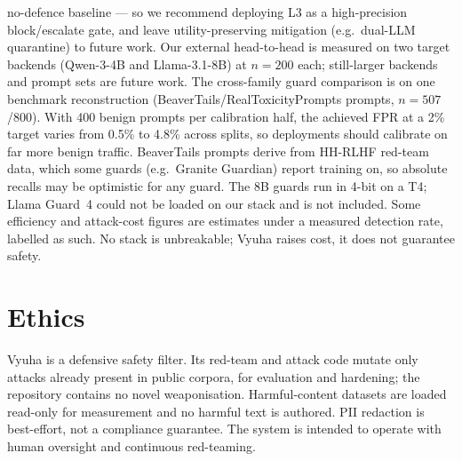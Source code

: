 \documentclass[11pt]{article}
\begin{document}
no-defence baseline --- so we recommend deploying L3 as a high-precision block/escalate gate, and leave
utility-preserving mitigation (e.g.\ dual-LLM quarantine) to future work. Our external head-to-head is
measured on two target backends (Qwen-3-4B and Llama-3.1-8B) at $n{=}200$ each; still-larger backends
and prompt sets are future work. The cross-family guard comparison is on one benchmark reconstruction (BeaverTails/RealToxicityPrompts
prompts, $n{=}507$/800). With 400 benign prompts per calibration half, the achieved FPR at a 2\% target
varies from 0.5\% to 4.8\% across splits, so deployments should calibrate on far more benign traffic. BeaverTails
prompts derive from HH-RLHF red-team data, which some guards (e.g.\ Granite Guardian) report training on,
so absolute recalls may be optimistic for any guard. The 8B guards run in 4-bit on a T4; Llama Guard~4
could not be loaded on our stack and is not included. Some
efficiency and attack-cost figures are estimates under a measured detection rate, labelled as such. No
stack is unbreakable; Vyuha raises cost, it does not guarantee safety.

\section*{Ethics}
Vyuha is a defensive safety filter. Its red-team and attack code mutate only attacks already present
in public corpora, for evaluation and hardening; the repository contains no novel weaponisation.
Harmful-content datasets are loaded read-only for measurement and no harmful text is authored. PII
redaction is best-effort, not a compliance guarantee. The system is intended to operate with human
oversight and continuous red-teaming.
\end{document}
